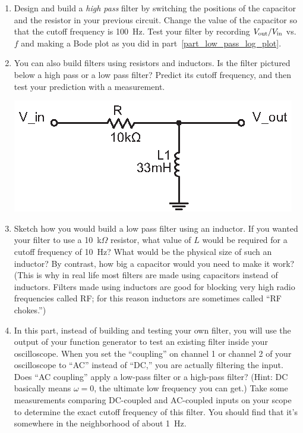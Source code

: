\begin{enumerate}[wide]
\item Design and build a \textit{high pass} filter by switching the positions of the capacitor and the resistor in your previous circuit.  Change the value of the capacitor so that the cutoff frequency is 100~Hz.  Test your filter by recording $V_{\rm out}/V_{\rm in}$ vs. $f$ and making a Bode plot as you did in part~\ref{part_low_pass_log_plot}.  \label{part_high_pass_RC}

\item You can also build filters using resistors and inductors.  Is the filter pictured below a high pass or a low pass filter?  Predict its cutoff frequency, and then test your prediction with a measurement. \label{part_high_pass_RL}
\begin{center}
\includegraphics{filters/high_pass_filter_LR.eps}
\end{center}

\item Sketch how you would build a low pass filter using an inductor.  If you wanted your filter to use a 10~k$\Omega$ resistor, what value of $L$ would be required for a cutoff frequency of 10~Hz?  What would be the physical size of such an inductor?  By contrast, how big a capacitor would you need to make it work?  (This is why in real life most filters are made using capacitors instead of inductors.  Filters made using inductors are good for blocking very high radio frequencies called RF; for this reason inductors are sometimes called ``RF chokes.'')  \label{part_low_pass_RL}

\item In this part, instead of building and testing your own filter, you will use the output of your function generator to test an existing filter inside your oscilloscope.  When you set the ``coupling'' on channel 1 or channel 2 of your oscilloscope to ``AC'' instead of ``DC,'' you are actually filtering the input.  Does ``AC coupling'' apply a low-pass filter or a high-pass filter?  (Hint: DC basically means $\omega=0$, the ultimate low frequency you can get.) Take some measurements comparing DC-coupled and AC-coupled inputs on your scope to determine the exact cutoff frequency of this filter.  You should find that it's somewhere in the neighborhood of about 1~Hz.


\end{enumerate}
